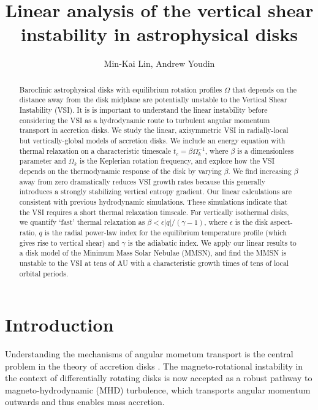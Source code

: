 \documentclass[iop]{emulateapj}
\begin{document}
\title{Linear analysis of the vertical shear instability in astrophysical disks}

\author{Min-Kai Lin, Andrew Youdin}

\begin{abstract}
  Baroclinic astrophysical disks with equilibrium rotation profiles
  $\Omega$ that depends on the distance away from the disk midplane are
  potentially unstable to the Vertical Shear Instability (VSI). It is
  is important to understand the linear instability before
  considering the VSI as a hydrodynamic route to turbulent angular
  momentum transport in accretion disks. We study the linear,
  axisymmetric VSI in radially-local but vertically-global models
  of accretion disks. We include an energy equation with thermal
  relaxation on a characteristic timescale $t_c=\beta\Omega_k^{-1}$,
  where $\beta$ is a dimensionless parameter and $\Omega_k$ is the
  Keplerian rotation frequency, and explore how the VSI depends on the
  thermodynamic response  of the disk by varying $\beta$. We find
  increasing $\beta$ away from zero dramatically reduces VSI growth
  rates because this generally introduces a strongly stabilizing
  vertical entropy gradient. Our linear calculations are consistent
  with previous hydrodynamic simulations. These simulations indicate that the VSI 
  requires a short thermal relaxation timscale. For vertically 
  isothermal disks, we quantify `fast'
  thermal relaxation as $\beta < \epsilon|q|/(\gamma-1)$, where
  $\epsilon$ is the disk aspect-ratio, $q$ is the radial power-law
  index for the equilibrium temperature profile (which gives rise to vertical 
  shear) and $\gamma$ is the adiabatic index. We apply our linear
  results to a disk model of the Minimum Mass Solar Nebulae (MMSN), and
  find the MMSN is unstable to the VSI at tens of AU with a
  characteristic growth times of tens of local orbital periods. 
\end{abstract}

\section{Introduction}
Understanding the mechanisms of angular mometum transport is the
central problem in the theory of accretion disks
\citep{lyndenbell74}. The  
magneto-rotational instability in the context of differentially
rotating disks \citep[MRI,][]{balbus91} is now accepted as a robust
pathway to magneto-hydrodynamic (MHD) turbulence, which transports
angular momentum outwards and thus enables mass accretion. 
\end{document}
